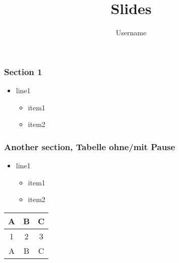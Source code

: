 \documentclass[14pt,t]{beamer}
\title{Slides}
\author{Username}
\begin{document}
\maketitle

\begin{frame}
\frametitle{Section 1}
\begin{itemize}
\item line1
\begin{itemize}
\item item1
\item item2
\end{itemize}
\end{itemize}
\end{frame}


\begin{frame}
\frametitle{Another section, Tabelle ohne/mit Pause}
\begin{itemize}
\item line1
\begin{itemize}
\item item1
\item item2
\end{itemize}
\end{itemize}
\smallskip
\begin{center}
\begin{tabular}{c c c}
\hline
A & B & C \\ 
\hline
\hline
1 & 2 & 3 \\  
\hline
A & B & C \\ 
\hline
\end{tabular} 
\end{center}
\end{frame}
 
\end{document}
